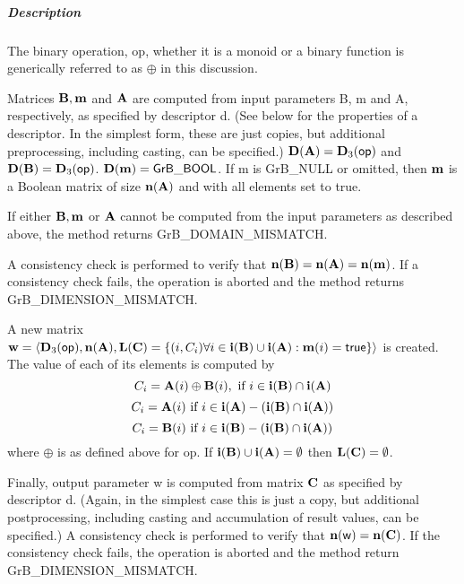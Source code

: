 \subparagraph{Description}


The binary operation, {\sf op}, whether it is a monoid or a binary function
is generically referred to as $\oplus$ in this discussion.

Matrices ${\bf B}, {\bf m}$ and ${\bf A}$ are computed from
input parameters {\sf B}, {\sf m} and {\sf A}, respectively, as specified
by descriptor {\sf d}. (See below for the properties of a descriptor. In
the simplest form, these are just copies, but additional preprocessing,
including casting, can be specified.)  $\bold{D}({\bf A}) =
\bold{D}_3({\sf op})$ and $\bold{D}({\bf B}) = \bold{D}_3({\sf op})$.
$\bold{D}({\bf m}) = {\sf GrB\_BOOL}$.  If {\sf m} is {\sf GrB\_NULL} or omitted,
then ${\bf m}$ is a Boolean matrix of size $\bold{n}({\bf A})$
and with all elements set to {\sf true}.

If either ${\bf B}, {\bf m}$ or ${\bf A}$ cannot be computed
from the input parameters as described above, the method returns {\sf
	GrB\_DOMAIN\_MISMATCH}.

A consistency check is performed to verify that $\bold{n}({\bf B})
= \bold{n}({\bf A}) = \bold{n}({\bf m})$. If a consistency check fails, the operation is
aborted and the method returns {\sf GrB\_DIMENSION\_MISMATCH}.

A new matrix ${\bf w} = \langle \bold{D}_3({\sf op}),
\bold{n}({\bf A}), \bold{L}({\bf C}) = \{(i,C_i)  \forall i \in
{\bf i}({\bf B}) \cup {\bf i}({\bf A}) : {\bf m}(i)
= {\sf true} \} \rangle$ is created.  The value of each of its
elements is computed by 
\[
C_i = {\bf A}(i) \oplus {\bf B}(i), \ \mbox{if}\  i \in  {\bf i}({\bf B}) \cap {\bf i}({\bf A})
\]
\[
C_i = {\bf A}(i) \ \mbox{if}\  i \in  {\bf i}({\bf A}) - ({\bf i}({\bf B}) \cap {\bf i}({\bf A}))
\]
\[
C_i = {\bf B}(i) \ \mbox{if}\  i \in  {\bf i}({\bf B}) - ({\bf i}({\bf B}) \cap {\bf i}({\bf A}))
\]
where $\oplus$ is as defined above for {\sf op}.
If ${\bf i}({\bf B}) \cup {\bf i}({\bf A}) = \emptyset$
then $\bold{L}({\bf C}) = \emptyset$.

Finally, output parameter {\sf w} is computed from matrix ${\bf C}$
as specified by descriptor {\sf d}. (Again, in the simplest case this
is just a copy, but additional postprocessing, including casting and
accumulation of result values, can be specified.)  A consistency check is
performed to verify that $\bold{n}({\sf w}) = \bold{n}({\bf C})$. If
the consistency check fails, the operation is aborted and the method
return {\sf GrB\_DIMENSION\_MISMATCH}.
